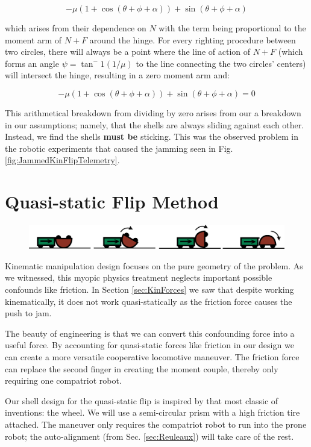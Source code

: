 \documentclass[letterpaper]{report}
\begin{document}
$$-\mu (1+\cos(\theta + \phi + \alpha)) + \sin(\theta + \phi + \alpha)$$

which arises from their dependence on $N$ with the term being proportional to the moment arm of $N+F$ around the hinge.
For every righting procedure between two circles, there will always be a point where the line of action of $N+F$ (which forms an angle $\psi = \tan^-1(1/\mu)$ to the line connecting the two circles' centers) will intersect the hinge, resulting in a zero moment arm and:

$$-\mu (1+\cos(\theta + \phi + \alpha)) + \sin(\theta + \phi + \alpha) = 0$$

This arithmetical breakdown from dividing by zero arises from our a breakdown in our assumptions; namely, that the shells are always sliding against each other.
Instead, we find the shells \textbf{must be} sticking.
This was the observed problem in the robotic experiments that caused the jamming seen in Fig. \ref{fig:JammedKinFlipTelemetry}.

\chapter{Quasi-static Flip Method}
\begin{figure}[ht]
\centering
\includegraphics[width=1.0\textwidth]{QuasiStatic_CoopCartoon.png}
\end{figure}

Kinematic manipulation design focuses on the pure geometry of the problem.
As we witnessed, this myopic physics treatment neglects important possible confounds like friction.
In Section \ref{sec:KinForces} we saw that despite working kinematically, it does not work quasi-statically as the friction force causes the push to jam.

The beauty of engineering is that we can convert this confounding force into a useful force.
By accounting for quasi-static forces like friction in our design we can create a more versatile cooperative locomotive maneuver.
The friction force can replace the second finger in creating the moment couple, thereby only requiring one compatriot robot.

Our shell design for the quasi-static flip is inspired by that most classic of inventions: the wheel.
We will use a semi-circular prism with a high friction tire attached.
The maneuver only requires the compatriot robot to run into the prone robot; the auto-alignment (from Sec. \ref{sec:Reuleaux}) will take care of the rest.
\end{document}
